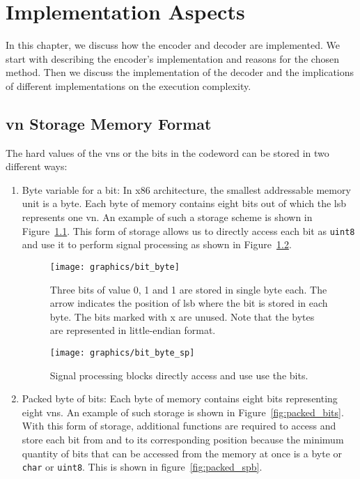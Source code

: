 \chapter{Implementation Aspects}\label{ch:imple}
In this chapter, we discuss how the encoder and decoder are implemented. We start with describing the encoder's implementation and reasons for the chosen method. Then we discuss the implementation of the decoder and the implications of different implementations on the execution complexity.
\section{\acrlong{vn} Storage Memory Format}
The hard values of the \glspl{vn} or the bits in the codeword can be stored in two different ways:
\begin{enumerate}
  \item Byte variable for a bit: In x86 architecture, the smallest addressable memory unit is a byte. Each byte of memory contains eight bits out of which the \gls{lsb} represents one \gls{vn}. An example of such a storage scheme is shown in Figure~\ref{fig:bit_byte}. This form of storage allows us to directly access each bit as \texttt{uint8} and use it to perform signal processing as shown in Figure~\ref{fig:bit_byte_sp}.
  \begin{figure}[htbp]
    \centering
    \texttt{[image: graphics/bit\_byte]}
    \caption[Illustration of Byte-for-a-bit storage format.]{Three bits of value 0, 1 and 1 are stored in single byte each. The arrow indicates the position of \gls{lsb} where the bit is stored in each byte. The bits marked with x are unused. Note that the bytes are represented in little-endian format.}
    \label{fig:bit_byte}
  \end{figure}
  \begin{figure}[htbp]
    \centering
    \texttt{[image: graphics/bit\_byte\_sp]}
    \caption[Usage of bits stored in Byte-for-a-bit format.]{Signal processing blocks directly access and use use the bits.}
    \label{fig:bit_byte_sp}
  \end{figure}
  \item Packed byte of bits: Each byte of memory contains eight bits representing eight \glspl{vn}. An example of such storage is shown in Figure~\ref{fig:packed_bits}. With this form of storage, additional functions are required to access and store each bit from and to its corresponding position because the minimum quantity of bits that can be accessed from the memory at once is a byte or \texttt{char} or \texttt{uint8}. This is shown in figure~\ref{fig:packed_spb}.

\end{enumerate}
